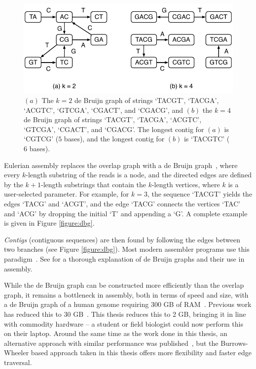 \begin{figure}[!h]
	\begin{center}
		\includegraphics[scale=0.8]{images/altering-k.pdf}
		\caption{$(a)$ The $k=2$ de Bruijn graph of strings `TACGT', `TACGA', `ACGTC', `GTCGA', `CGACT', and
			`CGACG', and $(b)$ the $k=4$ de Bruijn graph of strings `TACGT', `TACGA', `ACGTC', `GTCGA', `CGACT', and
			`CGACG'. The longest contig for $(a)$ is `CGTCG' ($5$ bases), and the longest contig for $(b)$ is `TACGTC' ($6$ bases).}
		\label{figure:varying-k}
	\end{center}
\end{figure}


Eulerian assembly replaces the overlap graph with a de Bruijn graph~\cite{IW95, PTW}, where every $k$-length substring of the reads is a node, and the directed edges are defined by the $k+1$-length substrings that contain the $k$-length vertices, where $k$ is a user-selected parameter. For example, for $k=3$, the sequence `TACGT' yields the edges `TACG' and `ACGT', and the edge `TACG' connects the vertices `TAC' and `ACG' by dropping the initial `T' and appending a `G'. A complete example is given in Figure \ref{figure:dbg}.

\emph{Contigs} (contiguous sequences) are then found by following the edges between two branches (see Figure \ref{figure:dbg}). Most modern assembler programs use this paradigm~\cite{bankevich2012spades,peng2010idba,Li:2010,Simpson:2009,Butler:2008,SahShi12,MacPrz09,ZerBir08}. See \cite{Compeau11} for a thorough explanation of de Bruijn graphs and their use in assembly.

While the de Bruijn graph can be constructed more efficiently than the overlap graph, it remains a bottleneck in assembly, both in terms of speed and size, with a de Bruijn graph of a human genome requiring 300 GB of RAM~\cite{Simpson:2009}. Previous work has reduced this to 30 GB~\cite{conway}. This thesis reduces this to 2 GB, bringing it in line with commodity hardware -- a student or field biologist could now perform this on their laptop. Around the same time as the work done in this thesis, an alternative approach with similar performance was published~\cite{wabi}, but the Burrows-Wheeler based approach taken in this thesis offers more flexibility and faster edge traversal.



